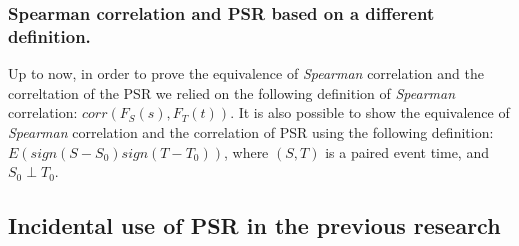 \documentclass[]{article}
\begin{document}
\subsubsection{Spearman correlation and PSR based on a different definition.}
Up to now, in order to prove the equivalence of \emph{Spearman} correlation and the correltation of the PSR we relied on the following definition of \emph{Spearman} correlation: $corr(F_S(s), F_T(t))$. It is also possible to show the equivalence of \emph{Spearman} correlation and the correlation of PSR using the following definition: $E(sign(S-S_0)sign(T-T_0))$, where $(S,T)$ is a paired event time, and $S_0 \perp T_0$.


\subsection{Incidental use of PSR in the previous research}
\end{document}
